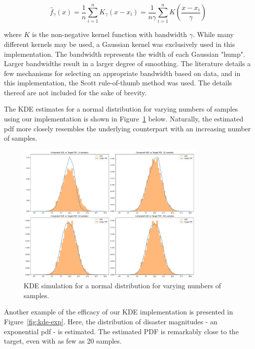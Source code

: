 \begin{equation}
\widehat{f}_{\gamma}(x)=\frac{1}{n} \sum_{i=1}^{n} K_{\gamma}\left(x-x_{i}\right)=\frac{1}{n \gamma} \sum_{i=1}^{n} K\left(\frac{x-x_{i}}{\gamma}\right)
\label{eq: KDE Estimate}
\end{equation}

where $K$ is the non-negative kernel function with bandwidth $\gamma$. While many different kernels may be used, a Gaussian kernel was exclusively used in this implementation. The bandwidth represents the width of each Gaussian "hump". Larger bandwidths result in a larger degree of smoothing. The literature details a few mechanisms for selecting an appropriate bandwidth based on data, and in this implementation, the Scott rule-of-thumb method was used. The details thereof are not included for the sake of brevity.

The KDE estimates for a normal distribution for varying numbers of samples using our implementation is shown in Figure~\ref{fig:KDE_uniform} below. Naturally, the estimated pdf more closely resembles the underlying counterpart with an increasing number of samples.

\begin{figure}[!htb]
    \centering
    \includegraphics[width=0.82\textwidth]{13_team5_agentdesign/images/kde_plots.png}
    \caption{KDE simulation for a normal distribution for varying numbers of samples.}
    \label{fig:KDE_uniform}
\end{figure}

\newpage
Another example of the efficacy of our KDE implementation is presented in Figure~\ref{fig:kde-exp}. Here, the distribution of disaster magnitudes - an exponential pdf - is estimated. The estimated PDF is remarkably close to the target, even with as few as 20 samples.

